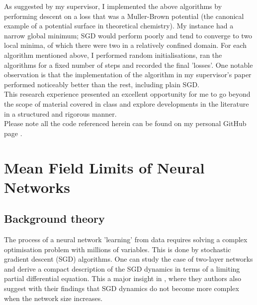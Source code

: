\documentclass{article}
\theoremstyle{mystyle}
\begin{document}
As suggested by my supervisor, I implemented the above algorithms by performing descent on a loss that was a Muller-Brown potential (the canonical example of a potential surface in theoretical chemistry). My instance had a narrow global minimum; SGD would perform poorly and tend to converge to two local minima, of which there were two in a relatively confined domain. For each algorithm mentioned above, I performed random initialisations, ran the algorithms for a fixed number of steps and recorded the final 'losses'. One notable observation is that the implementation of the algorithm in my supervisor’s paper performed noticeably better than the rest, including plain SGD.\\

This research experience presented an excellent opportunity for me to go beyond the scope of material covered in class and explore developments in the literature in a structured and rigorous manner. \\

Please note all the code referenced herein can be found on my personal GitHub page \cite{Tassopoulos_Imperial_Summer_Research_2023} . \\

\newpage
\section{Mean Field Limits of Neural Networks}\label{sec: mean field neural net}

\subsection{Background theory}\label{sec: neural net single layer}

The process of a neural network 'learning' from data requires solving a complex optimisation problem with millions of variables. This is done by stochastic gradient descent (SGD) algorithms. One can study the case of two-layer networks and derive a compact description of the SGD dynamics in terms of a limiting partial differential equation. This a major insight in \cite{Mei_2018}, where they authors also suggest with their findings that SGD dynamics do not become more complex when the network size increases.\\ 
\end{document}
